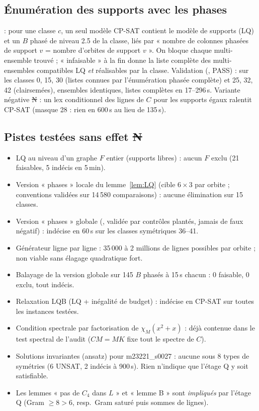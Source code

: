 \subsection{Énumération des supports avec les phases}
 : pour une classe $c$, un seul modèle CP-SAT contient le modèle de supports (LQ) et un $B$ phasé de niveau 2.5
de la classe, liés par « nombre de colonnes phasées de support $v$ = nombre d'orbites de support $v$ ». On bloque chaque multi-ensemble trouvé ;
« infaisable » à la fin donne la liste complète des multi-ensembles compatibles LQ \emph{et} réalisables par la classe. Validation
(, PASS) : sur les classes 0, 15, 30 (listes connues par l'énumération phasée complète) et 25, 32, 42
(clairsemées), ensembles identiques, listes complètes en 17--296\,s.
Variante négative \st{N} : un lex conditionnel des lignes de $C$ pour les supports égaux ralentit CP-SAT (masque 28 : rien en 600\,s au lieu de 135\,s).

\subsection{Pistes testées sans effet \st{N}}
\begin{itemize}[nosep]
\item LQ au niveau d'un graphe $F$ entier (supports libres) : aucun $F$ exclu (21 faisables, 5 indécis en 5\,min).
\item Version « phases » locale du lemme~\ref{lem:LQ} (cible $6\times3$ par orbite ; conventions validées sur 14\,580 comparaisons) : aucune élimination sur 15 classes.
\item Version « phases » globale (, validée par contrôles plantés, jamais de faux négatif) : indécise en 60\,s sur les classes
symétriques 36--41.
\item Générateur ligne par ligne : 35\,000 à 2 millions de lignes possibles par orbite ; non viable sans élagage quadratique fort.
\item Balayage de la version globale sur 145 $B$ phasés à 15\,s chacun : 0 faisable, 0 exclu, tout indécis.
\item Relaxation LQB (LQ + inégalité de budget) : indécise en CP-SAT sur toutes les instances testées.
\item Condition spectrale par factorisation de $\chi_M(x^2+x)$ : déjà contenue dans le test spectral de l'audit ($CM=MK$ fixe tout le spectre de $C$).
\item Solutions invariantes (ansatz) pour m23221\_s0027 : aucune sous 8 types de symétries (6 UNSAT, 2 indécis à 900\,s). Rien n'indique que l'étage Q
y soit satisfiable.
\item Les lemmes « pas de $C_4$ dans $L$ » et « lemme B » sont \emph{impliqués} par l'étage Q (Gram $\ge8>6$, resp.\ Gram saturé puis sommes de lignes).
\end{itemize}

